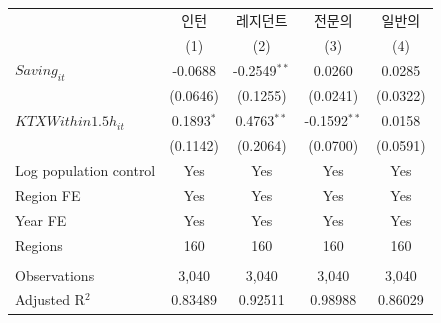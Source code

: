 \begingroup
\centering
\begin{tabular}{lcccc}
   \toprule
                          & 인턴         & 레지던트       & 전문의         & 일반의 \\   
                          & (1)          & (2)            & (3)            & (4)\\  
   \midrule 
   $Saving_{it}$          & -0.0688      & -0.2549$^{**}$ & 0.0260         & 0.0285\\   
                          & (0.0646)     & (0.1255)       & (0.0241)       & (0.0322)\\   
   $KTXWithin1.5h_{it}$   & 0.1893$^{*}$ & 0.4763$^{**}$  & -0.1592$^{**}$ & 0.0158\\   
                          & (0.1142)     & (0.2064)       & (0.0700)       & (0.0591)\\   
   Log population control & Yes          & Yes            & Yes            & Yes\\  
   Region FE              & Yes          & Yes            & Yes            & Yes\\  
   Year FE                & Yes          & Yes            & Yes            & Yes\\  
   Regions                & 160          & 160            & 160            & 160\\  
    \\
   Observations           & 3,040        & 3,040          & 3,040          & 3,040\\  
   Adjusted R$^2$         & 0.83489      & 0.92511        & 0.98988        & 0.86029\\  
   \bottomrule
\end{tabular}
\par\endgroup
